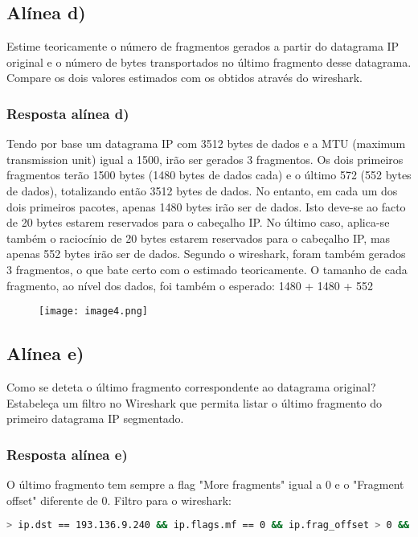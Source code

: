 \documentclass{article}
\begin{document}
\subsection{Alínea d)}

Estime teoricamente o número de fragmentos gerados a partir do datagrama IP original e o número de bytes
transportados no último fragmento desse datagrama. Compare os dois valores estimados com os obtidos através
do wireshark.
\pagebreak
\subsubsection{Resposta alínea d)}

Tendo por base um datagrama IP com 3512 bytes de dados e a MTU (maximum transmission unit) igual a 1500, irão ser gerados 3 fragmentos. Os dois primeiros fragmentos terão 1500 bytes (1480 bytes de dados cada) e o último 572 (552 bytes de dados), totalizando então 3512 bytes de dados.
No entanto, em cada um dos dois primeiros pacotes, apenas 1480 bytes irão ser de dados. Isto deve-se ao facto de 20 bytes estarem reservados para o cabeçalho IP. No último caso, aplica-se também o raciocínio de 20 bytes estarem reservados para o cabeçalho IP, mas apenas 552 bytes irão ser de dados.
Segundo o wireshark, foram também gerados 3 fragmentos, o que bate certo com o estimado teoricamente. O tamanho de cada fragmento, ao nível dos dados, foi também o esperado: 1480 + 1480 + 552

\begin{figure}[h]
    \centering
    \texttt{[image: image4.png]}
\end{figure}

\subsection{Alínea e)}

Como se deteta o último fragmento correspondente ao datagrama original? Estabeleça um filtro no Wireshark que
permita listar o último fragmento do primeiro datagrama IP segmentado.

\subsubsection{Resposta alínea e)}

O último fragmento tem sempre a flag "More fragments" igual a 0 e o "Fragment offset" diferente de 0. Filtro para o wireshark:
\begin{lstlisting}[language=Bash]
> ip.dst == 193.136.9.240 && ip.flags.mf == 0 && ip.frag_offset > 0 && ip.id == 0x3886
\end{lstlisting}
\end{document}
